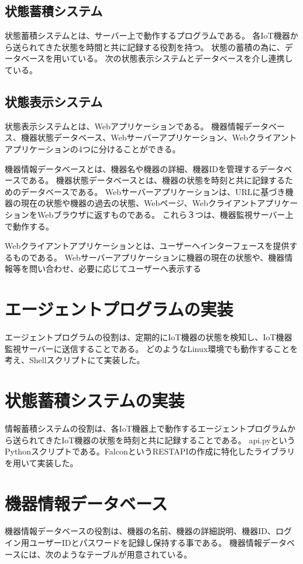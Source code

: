 \subsection{状態蓄積システム}
状態蓄積システムとは、サーバー上で動作するプログラムである。
各IoT機器から送られてきた状態を時間と共に記録する役割を持つ。
状態の蓄積の為に、データベースを用いている。
次の状態表示システムとデータベースを介し連携している。

\subsection{状態表示システム}
状態表示システムとは、Webアプリケーションである。
機器情報データベース、機器状態データベース、Webサーバーアプリケーション、Webクライアントアプリケーションの4つに分けることができる。
\medskip

機器情報データベースとは、機器名や機器の詳細、機器IDを管理するデータベースである。
機器状態データベースとは、機器の状態を時刻と共に記録するためのデータベースである。
Webサーバーアプリケーションは、URLに基づき機器の現在の状態や機器の過去の状態、Webページ、WebクライアントアプリケーションをWebブラウザに返すものである。
これら３つは、機器監視サーバー上で動作する。
\medskip

Webクライアントアプリケーションとは、ユーザーへインターフェースを提供するものである。
Webサーバーアプリケーションに機器の現在の状態や、機器情報等を問い合わせ、必要に応じてユーザーへ表示する

\section{エージェントプログラムの実装}
エージェントプログラムの役割は、定期的にIoT機器の状態を検知し、IoT機器監視サーバーに送信することである。
どのようなLinux環境でも動作することを考え、Shellスクリプトにて実装した。

\section{状態蓄積システムの実装}
情報蓄積システムの役割は、各IoT機器上で動作するエージェントプログラムから送られてきたIoT機器の状態を時刻と共に記録することである。
api.pyというPythonスクリプトである。FalconというRESTAPIの作成に特化したライブラリを用いて実装した。

\section{機器情報データベース}
機器情報データベースの役割は、機器の名前、機器の詳細説明、機器ID、ログイン用ユーザーIDとパスワードを記録し保持する事である。
機器情報データベースには、次のようなテーブルが用意されている。
